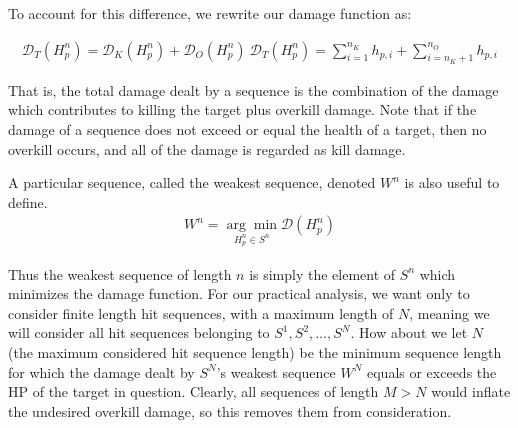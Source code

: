 \documentclass{article}
\begin{document}
 To account for this difference, we rewrite our damage function as:
 
\begin{align*}
\mathcal{D}_T (H^n_p)=\mathcal{D}_K (H^n_p)+\mathcal{D}_O (H^n_p) \
     \mathcal{D}_T (H^n_p)=\sum _{i=1}^{n_{K}} h_{p,i}+\sum _{i=n_{K}+1}^{n_{O}} h_{p,i}
\end{align*}
    
    That is, the total damage dealt by a sequence is the combination of the damage which contributes to killing the target plus overkill damage. Note that if the damage of a sequence does not exceed or equal the health of a target, then no overkill occurs, and all of the damage is regarded as kill damage.
    
    A particular sequence, called the weakest sequence, denoted $W^n$ is also useful to define. 
\begin{align*}
W^n=\underset{H^n_p\in S^n}{\arg\min}\mathcal{D} (H^n_p)
\end{align*}

	Thus the weakest sequence of length $n$ is simply the element of $S^n$ which minimizes the damage function. For our practical analysis, we want only to consider finite length hit sequences, with a maximum length of $N$, meaning we will consider all hit sequences belonging to $S^1, S^2, \ldots , S^N$. How about we let $N$ (the maximum considered hit sequence length) be the minimum sequence length for which the damage dealt by $S^N$'s weakest sequence $W^N$ equals or exceeds the HP of the target in question. Clearly, all sequences of length $M>N$ would inflate the undesired overkill damage, so this removes them from consideration.    
\end{document}

